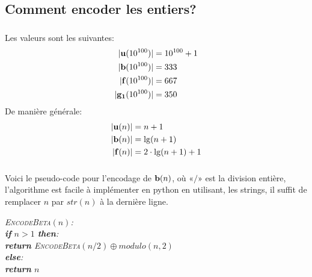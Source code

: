 \documentclass{article}
\newenvironment{pseudo}{\begin{tcolorbox}[left skip = 2cm, right skip = 2cm]\itshape}{\end{tcolorbox}}
\newcommand{\key}[1]{{\bf #1}}
\newcommand{\name}[1]{{\scshape #1}}
\newcommand\tab[1][0.5cm]{\hspace*{#1}}
\begin{document}
\subsection{Comment encoder les entiers?}
\subsubsection{}
Les valeurs sont les suivantes:
$$\begin{aligned}
  |\key{u}(10^{100})| &= 10^{100} + 1\\
  |\key{b}(10^{100})| &= 333\\
  |\key{f}(10^{100})| &= 667\\
  |\key{g_1}(10^{100})| &= 350
\end{aligned}$$
De manière générale:
$$\begin{aligned}
  |\key{u}(n)| &= n + 1\\
  |\key{b}(n)| &= \lg(n + 1)\\
  |\key{f}(n)| &= 2 \cdot \lg(n + 1) + 1\\
\end{aligned}$$
\subsubsection{}
Voici le pseudo-code pour l'encodage de $\key{b}(n)$, où «$/$» est la division entière, l'algorithme est facile à implémenter en python en utilisant, les strings, il suffit de remplacer $n$ par $str(n)$ à la dernière ligne.
\begin{pseudo}
  \name{EncodeBeta}$(n)$:\\
  \tab{} \key{if} $n > 1$ \key{then}:\\
  \tab{}\tab{} \key{return} \name{EncodeBeta}$(n / 2) \oplus modulo(n, 2)$\\
  \tab{} \key{else}:\\
  \tab{}\tab{} \key{return} $n$
\end{pseudo}
\end{document}
